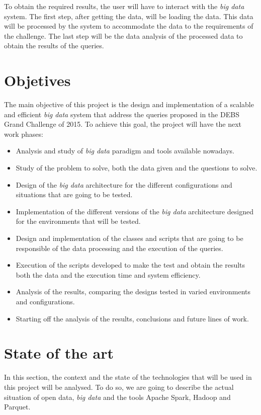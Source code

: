 To obtain the required results, the user will have to interact with the \textit{big data} system. The first step, after getting the data, will be loading the data. This data will be processed by the system to accommodate the data to the requirements of the challenge. The last step will be the data analysis of the processed data to obtain the results of the queries.

\section{Objetives}
The main objective of this project is the design and implementation of a scalable and efficient \textit{big data} system that address the queries proposed in the \gls{DEBS} Grand Challenge of 2015. To achieve this goal, the project will have the next work phases:

\begin{itemize}
\item Analysis and study of \textit{big data} paradigm and tools available nowadays.

\item Study of the problem to solve, both the data given and the questions to solve.
	
\item Design of the \textit{big data} architecture for the different configurations and situations that are going to be tested.
	
\item Implementation of the different versions of the \textit{big data} architecture designed for the environments that will be tested.
	
\item Design and implementation of the classes and scripts that are going to be responsible of the data processing and the execution of the queries.
	
\item Execution of the scripts developed to make the test and obtain the results both the data and the execution time and system efficiency.
	
\item Analysis of the results, comparing the designs tested in varied environments and configurations.
	
\item Starting off the analysis of the results, conclusions and future lines of work.
\end{itemize}

\section{State of the art}
In this section, the context and the state of the technologies that will be used in this project will be analysed. To do so, we are going to describe the actual situation of open data, \textit{big data} and the tools Apache Spark, Hadoop and Parquet.

